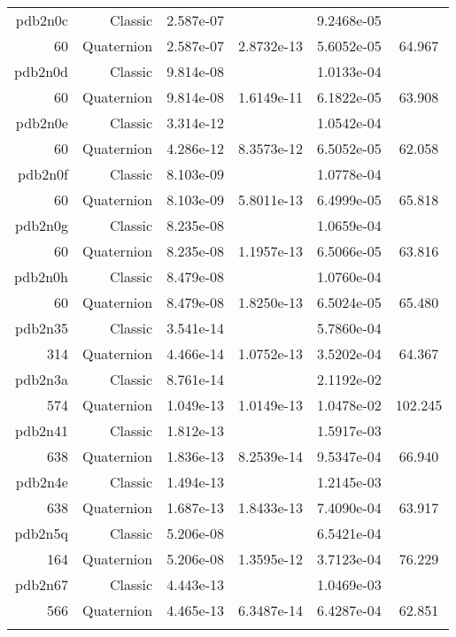 \begin{xltabular}{\textwidth}{r|rS[table-format=1.3e+2]S[table-format=1.4e+2]S[table-format=1.4e+2]S[table-format=-1.3]}
pdb2n0c & Classic & 2.587e-07 &  & 9.2468e-05 & \\
60 & Quaternion & 2.587e-07 & 2.8732e-13 & 5.6052e-05 & 64.967\\  \addlinespace
pdb2n0d & Classic & 9.814e-08 &  & 1.0133e-04 & \\
60 & Quaternion & 9.814e-08 & 1.6149e-11 & 6.1822e-05 & 63.908\\  \addlinespace
pdb2n0e & Classic & 3.314e-12 &  & 1.0542e-04 & \\
60 & Quaternion & 4.286e-12 & 8.3573e-12 & 6.5052e-05 & 62.058\\  \addlinespace
pdb2n0f & Classic & 8.103e-09 &  & 1.0778e-04 & \\
60 & Quaternion & 8.103e-09 & 5.8011e-13 & 6.4999e-05 & 65.818\\  \addlinespace
pdb2n0g & Classic & 8.235e-08 &  & 1.0659e-04 & \\
60 & Quaternion & 8.235e-08 & 1.1957e-13 & 6.5066e-05 & 63.816\\  \addlinespace
pdb2n0h & Classic & 8.479e-08 &  & 1.0760e-04 & \\
60 & Quaternion & 8.479e-08 & 1.8250e-13 & 6.5024e-05 & 65.480\\  \addlinespace
pdb2n35 & Classic & 3.541e-14 &  & 5.7860e-04 & \\
314 & Quaternion & 4.466e-14 & 1.0752e-13 & 3.5202e-04 & 64.367\\  \addlinespace
pdb2n3a & Classic & 8.761e-14 &  & 2.1192e-02 & \\
574 & Quaternion & 1.049e-13 & 1.0149e-13 & 1.0478e-02 & 102.245\\  \addlinespace
pdb2n41 & Classic & 1.812e-13 &  & 1.5917e-03 & \\
638 & Quaternion & 1.836e-13 & 8.2539e-14 & 9.5347e-04 & 66.940\\  \addlinespace
pdb2n4e & Classic & 1.494e-13 &  & 1.2145e-03 & \\
638 & Quaternion & 1.687e-13 & 1.8433e-13 & 7.4090e-04 & 63.917\\  \addlinespace
pdb2n5q & Classic & 5.206e-08 &  & 6.5421e-04 & \\
164 & Quaternion & 5.206e-08 & 1.3595e-12 & 3.7123e-04 & 76.229\\  \addlinespace
pdb2n67 & Classic & 4.443e-13 &  & 1.0469e-03 & \\
566 & Quaternion & 4.465e-13 & 6.3487e-14 & 6.4287e-04 & 62.851\\  \addlinespace

\end{xltabular}
